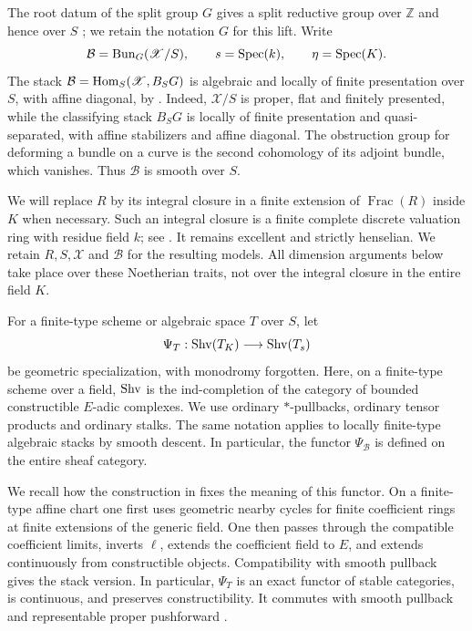 The root datum of the split group $G$ gives a split reductive group over
$\mathbb Z$ and hence over $S$
\cite[Theorems~6.1.16(2) and~6.1.17]{Conrad}; we retain the notation
$G$ for this lift.
Write
\[
 \mathcal B=\operatorname{Bun}_G(\mathscr X/S),\qquad
 s=\operatorname{Spec}(k),\qquad \eta=\operatorname{Spec}(K).
\]
The stack $\mathcal B=\operatorname{Hom}_S(\mathscr X,B_SG)$ is algebraic and locally
of finite presentation over $S$, with affine diagonal, by
\cite[Theorem~1.2(i)--(iii)]{HallRydh}. Indeed, $\mathscr X/S$ is proper,
flat and finitely presented, while the classifying stack $B_SG$ is
locally of finite presentation and quasi-separated, with affine
stabilizers and affine diagonal. The obstruction group for deforming
a bundle on a curve is the second cohomology of its adjoint bundle,
which vanishes. Thus $\mathcal B$ is smooth over $S$.

We will replace $R$ by its integral closure in a finite extension of
$\operatorname{Frac}(R)$ inside $K$ when necessary.  Such an integral closure
is a finite complete discrete valuation ring with residue field $k$;
see \cite[Tags~0EXQ and~0323]{Stacks}.  It remains excellent and strictly
henselian.  We retain $R,S,\mathscr X$ and $\mathcal B$ for the resulting
models.  All dimension arguments below take place over these Noetherian
traits, not over the integral closure in the entire field $K$.

For a finite-type scheme or algebraic space $T$ over $S$, let
\[
 \Psi_T:\operatorname{Shv}(T_K)\longrightarrow\operatorname{Shv}(T_s)
\]
be geometric specialization, with monodromy forgotten.  Here, on a
finite-type scheme over a field, $\operatorname{Shv}$ is the ind-completion of the
category of bounded constructible $E$-adic complexes.  We use ordinary
$*$-pullbacks, ordinary tensor products and ordinary stalks.  The same
notation applies to locally finite-type algebraic stacks by smooth descent.
In particular, the functor $\Psi_{\mathcal B}$ is defined on the entire
sheaf category.

We recall how the construction in \cite[\S\S4.1.1--4.1.5]{GR} fixes the
meaning of this functor.  On a finite-type affine chart one first uses
geometric nearby cycles for finite coefficient rings at finite extensions
of the generic field.  One then passes through the compatible coefficient
limits, inverts $\ell$, extends the coefficient field to $E$, and extends
continuously from constructible objects.  Compatibility with smooth
pullback gives the stack version.  In particular, $\Psi_T$ is an exact
functor of stable categories, is continuous, and preserves constructibility.
It commutes with smooth pullback and representable proper pushforward
\cite[\S4.1.6]{GR}.

